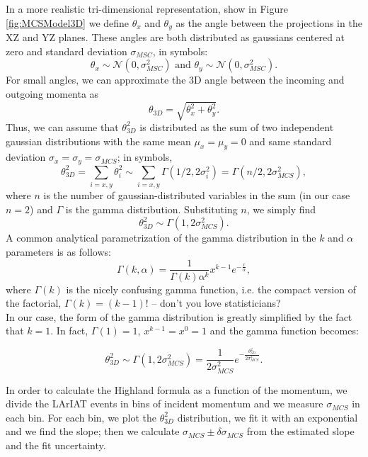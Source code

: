 \documentclass[aps,prl,twocolumn,showpacs,superscriptaddress,groupedaddress]{revtex4}  %
\begin{document}
In a more realistic tri-dimensional representation, show in Figure \ref{fig:MCSModel3D} we define  $\theta_x$ and $\theta_y$ as the angle between the projections in the XZ and YZ planes. These angles are both distributed as  gaussians centered at zero and standard deviation $\sigma_{MSC}$, in symbols:
\begin{equation}
\theta_{x} \sim \mathcal N (0, \sigma_{MSC}^2) \text{ and } \theta_{y} \sim \mathcal N (0, \sigma_{MSC}^2).
\end{equation}
For small angles,  we can approximate the 3D angle between the incoming and outgoing momenta as 
\begin{equation}
\theta_{3D} = \sqrt{ \theta_x^2 + \theta_y^2}.
\end{equation}
Thus, we can assume that $\theta_{3D}^2$ is distributed as the sum of two independent gaussian distributions with the same mean $\mu_x=\mu_y=0$ and same standard deviation $\sigma_x=\sigma_y=\sigma_{MCS}$; in symbols,
\begin{equation}
\theta^2_{3D} = \sum_{i=x,y}\theta^2_i \sim \sum_{i=x,y}\Gamma(1/2, 2\sigma_i^2) = \Gamma(n/2, 2\sigma^2_{MCS}),
\end{equation} 
where $n$ is the number of gaussian-distributed variables in the sum (in our case $n=2$) and $\Gamma$ is the gamma distribution. Substituting $n$, we simply find 
\begin{equation}
\theta^2_{3D}  \sim  \Gamma(1, 2\sigma^2_{MCS}). 
\end{equation} 
A common analytical parametrization of the gamma distribution in the $k$ and $\alpha$ parameters is as follows:
\begin{equation}
\Gamma(k, \alpha) = \frac{1}{\Gamma(k) \alpha^k}x^{k-1}e^{-\frac{x}{\alpha}}, 
\end{equation} 
where $\Gamma(k)$ is the nicely confusing gamma function, i.e. the compact version of the factorial, $\Gamma(k) = (k-1)!$  -- don't you love statisticians?   \\
In our case, the form of the gamma distribution is greatly simplified by the fact that $k=1$. In fact, $\Gamma(1) = 1$, $x^{k-1} = x^0 = 1$ and the gamma function  becomes:

\begin{equation}
\theta^2_{3D}  \sim \Gamma(1, 2\sigma^2_{MCS}) = \frac{1}{2\sigma^2_{MCS}}e^{-\frac{\theta^2_{3D} }{2\sigma^2_{MCS}}}. 
\end{equation} 


In order to calculate the Highland formula as a function of the momentum, we divide the LArIAT events in bins of incident momentum and we measure $\sigma_{MCS}$ in each bin. For each bin, we plot the $\theta^2_{3D}$ distribution, we fit it with an exponential and we find the slope; then we calculate $\sigma_{MCS}\pm\delta\sigma_{MCS}$ from the estimated slope and the fit uncertainty.
\end{document}
